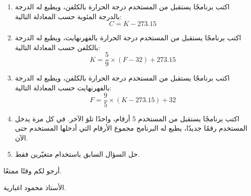 \documentclass[12pt]{article}
\begin{document}
\begin{enumerate}
\item
اكتب برنامجًا يستقبل من المستخدم درجة الحرارة بالكلفن، ويطبع له الدرجة بالدرجة المئوية حسب المعادلة التالية:
$$ C = K - 273.15 $$

\item
اكتب برنامجًا يستقبل من المستخدم درجة الحرارة بالفهرنهايت، ويطبع له الدرجة بالكلفن حسب المعادلة التالية:
$$ K = \frac{5}{9} \times (F - 32) + 273.15 $$

\item
اكتب برنامجًا يستقبل من المستخدم درجة الحرارة بالكلفن، ويطبع له الدرجة بالفهرنهايت حسب المعادلة التالية:
$$ F = \frac{9}{5} \times (K - 273.15) + 32 $$

\item
اكتب برنامجًا يستقبل من المستخدم 5 أرقام، واحدًا تلوَ الآخر. في كل مرة يدخل المستخدم رقمًا جديدًا، يطبع له البرنامج مجموع الأرقام التي أدخلها المستخدم حتى الآن.

\item
حل السؤال السابق باستخدام متغيّرين فقط.

\end{enumerate}

\vspace{3cm}
\begin{flushleft}
أرجو لكم وقتًا ممتعًا.

الأستاذ محمود اغبارية.
\end{flushleft}
\end{document}
